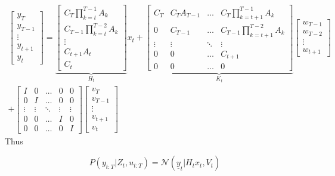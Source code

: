 \documentclass{article}
\begin{document}
\begin{multline}
\begin{bmatrix}y_T \\ y_{T-1} \\ \vdots \\ y_{t+1} \\ y_{t}\end{bmatrix}
 = \underbrace{  \begin{bmatrix}C_T \prod_{k=t}^{T-1} A_k \\ C_{T-1} \prod_{k=t}^{T-2} A_k \\ \vdots \\ C_{t+1} A_t \\ C_{t} \end{bmatrix}  }_{H_t} x_{t}
 + \underbrace{  \begin{bmatrix}C_T & C_T A_{T-1} & \hdots & C_T \prod_{k=t+1}^{T-1} A_k \\ 0 & C_{T-1} & \hdots & C_{T-1} \prod_{k=t+1}^{T-2} A_k \\ \vdots & \vdots & \ddots & \vdots \\ 0 & 0 & \hdots & C_{t+1} \\ 0 & 0 & \hdots & 0\end{bmatrix}  }_{K_t} \begin{bmatrix}w_{T-1} \\ w_{T-2} \\ \vdots \\ w_{t+1}\end{bmatrix} \\
 + \begin{bmatrix}I & 0 & \hdots & 0 & 0\\ 0 & I & \hdots & 0 & 0 \\ \vdots & \vdots & \ddots & \vdots & \vdots \\ 0 & 0 & \hdots & I & 0 \\ 0 & 0 & \hdots & 0 & I \end{bmatrix} \begin{bmatrix}v_T \\ v_{T-1} \\ \vdots \\ v_{t+1} \\ v_{t}\end{bmatrix}
\end{multline}
Thus

\begin{equation}
P(y_{t:T}|Z_t, u_{t:T}) = \mathcal{N}( \underline{y}_t|H_t x_t, V_t )
\end{equation}
\end{document}
